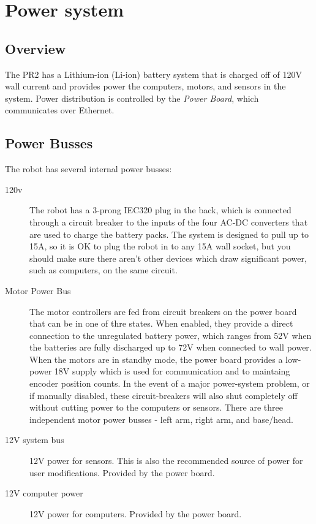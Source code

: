 \section{Power system}
\subsection{Overview}
The PR2 has a Lithium-ion (Li-ion) battery system that is charged off of 120V wall current and provides power the computers, motors, and sensors in the system.  Power distribution is controlled by the {\it Power Board}, which communicates over Ethernet.
\subsection{Power Busses}
The robot has several internal power busses:
\begin{description}
\item[120v] The robot has a 3-prong IEC320 plug in the back, which is connected through a circuit breaker to the inputs of the four AC-DC converters that are used to charge the battery packs.  The system is designed to pull up to 15A, so it is OK to plug the robot in to any 15A wall socket, but you should make sure there aren't other devices which draw significant power, such as computers, on the same circuit.
\item[Motor Power Bus] The motor controllers are fed from circuit breakers on the power board that can be in one of thre states.  When enabled, they provide a direct connection to the unregulated battery power, which ranges from 52V when the batteries are fully discharged up to 72V when connected to wall power.  When the motors are in standby mode, the power board provides a low-power 18V supply which is used for communication and to maintaing encoder position counts.  In the event of a major power-system problem, or if manually disabled, these circuit-breakers will also shut completely off without cutting power to the computers or sensors.  There are three independent motor power busses - left arm, right arm, and base/head.
\item[12V system bus]
12V power for sensors.  This is also the recommended source of power for user modifications. Provided by the power board.
\item[12V computer power]
12V power for computers.  Provided by the power board.
\end{description}
